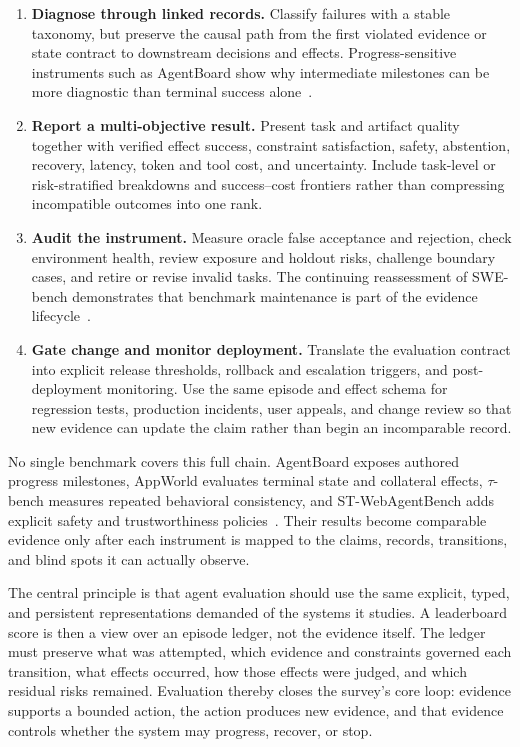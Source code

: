 \begin{enumerate}
    \item \textbf{Diagnose through linked records.} Classify failures with a stable taxonomy, but preserve the causal path from the first violated evidence or state contract to downstream decisions and effects. Progress-sensitive instruments such as AgentBoard show why intermediate milestones can be more diagnostic than terminal success alone~\cite{hsieh2024agentboard}.
    \item \textbf{Report a multi-objective result.} Present task and artifact quality together with verified effect success, constraint satisfaction, safety, abstention, recovery, latency, token and tool cost, and uncertainty. Include task-level or risk-stratified breakdowns and success--cost frontiers rather than compressing incompatible outcomes into one rank.
    \item \textbf{Audit the instrument.} Measure oracle false acceptance and rejection, check environment health, review exposure and holdout risks, challenge boundary cases, and retire or revise invalid tasks. The continuing reassessment of SWE-bench demonstrates that benchmark maintenance is part of the evidence lifecycle~\cite{openai2026swebenchaudit}.
    \item \textbf{Gate change and monitor deployment.} Translate the evaluation contract into explicit release thresholds, rollback and escalation triggers, and post-deployment monitoring. Use the same episode and effect schema for regression tests, production incidents, user appeals, and change review so that new evidence can update the claim rather than begin an incomparable record.
\end{enumerate}

No single benchmark covers this full chain. AgentBoard exposes authored progress milestones, AppWorld evaluates terminal state and collateral effects, $\tau$-bench measures repeated behavioral consistency, and ST-WebAgentBench adds explicit safety and trustworthiness policies~\cite{hsieh2024agentboard,trivedi2024appworld,yao2024taubench,levy2026stwebagentbench}. Their results become comparable evidence only after each instrument is mapped to the claims, records, transitions, and blind spots it can actually observe.

The central principle is that agent evaluation should use the same explicit, typed, and persistent representations demanded of the systems it studies. A leaderboard score is then a view over an episode ledger, not the evidence itself. The ledger must preserve what was attempted, which evidence and constraints governed each transition, what effects occurred, how those effects were judged, and which residual risks remained. Evaluation thereby closes the survey's core loop: evidence supports a bounded action, the action produces new evidence, and that evidence controls whether the system may progress, recover, or stop.
